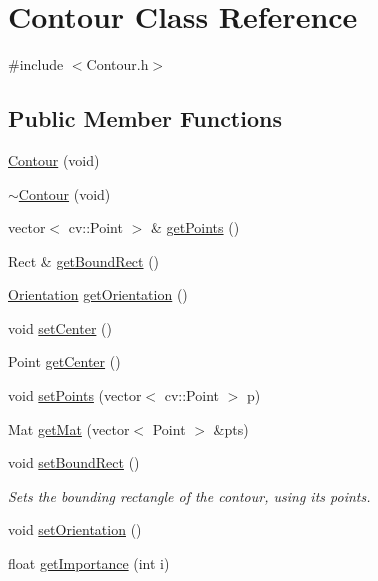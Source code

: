 \hypertarget{class_contour}{\section{Contour Class Reference}
\label{class_contour}
}


{\ttfamily \#include $<$Contour.\+h$>$}

\subsection*{Public Member Functions}
\begin{DoxyCompactItemize}
\item 
\hyperlink{class_contour_ac31a122f91e1a4a2462ecb802ed7170f}{Contour} (void)
\item 
\hyperlink{class_contour_ae8f5b046ccf380b396f54de0d01e731f}{$\sim$\+Contour} (void)
\item 
vector$<$ cv\+::\+Point $>$ \& \hyperlink{class_contour_abc363aff3d9b7642daa6cf3496b7bea0}{get\+Points} ()
\item 
Rect \& \hyperlink{class_contour_a6a0a7792ef282071a7bbde523ec0e96d}{get\+Bound\+Rect} ()
\item 
\hyperlink{_contour_8h_a25057779f97dd06805ea5fcf36635c40}{Orientation} \hyperlink{class_contour_a16c54703d99650fcca6752da59deaab7}{get\+Orientation} ()
\item 
void \hyperlink{class_contour_a866591bd98e4ebdbd511eb43ef511fd3}{set\+Center} ()
\item 
Point \hyperlink{class_contour_a7efb5a9005069c53af5fd291dc17d902}{get\+Center} ()
\item 
void \hyperlink{class_contour_a2064d4cd92143ab0e466ecba4eeb3b75}{set\+Points} (vector$<$ cv\+::\+Point $>$ p)
\item 
Mat \hyperlink{class_contour_af6da2b9bb1d742b35fb9c2c11f7b1dbe}{get\+Mat} (vector$<$ Point $>$ \&pts)
\item 
void \hyperlink{class_contour_ac3b85c445a9a648ebec59fdd2413194d}{set\+Bound\+Rect} ()
\begin{DoxyCompactList}\small\item\em Sets the bounding rectangle of the contour, using its points. \end{DoxyCompactList}\item 
void \hyperlink{class_contour_ad07917ec771f6c5df764fdeac7841613}{set\+Orientation} ()
\item 
float \hyperlink{class_contour_a29fab9bc4b308e3230172bda77650a72}{get\+Importance} (int i)

\end{DoxyCompactItemize}
